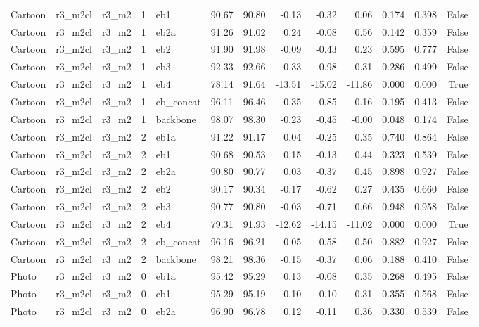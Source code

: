 \begin{table}
\begin{tabular}{lllrlrrrrrllr}
Cartoon & r3\_m2cl & r3\_m2 & 1 & eb1 & 90.67 & 90.80 & -0.13 & -0.32 & 0.06 & 0.174 & 0.398 & False \\
Cartoon & r3\_m2cl & r3\_m2 & 1 & eb2a & 91.26 & 91.02 & 0.24 & -0.08 & 0.56 & 0.142 & 0.359 & False \\
Cartoon & r3\_m2cl & r3\_m2 & 1 & eb2 & 91.90 & 91.98 & -0.09 & -0.43 & 0.23 & 0.595 & 0.777 & False \\
Cartoon & r3\_m2cl & r3\_m2 & 1 & eb3 & 92.33 & 92.66 & -0.33 & -0.98 & 0.31 & 0.286 & 0.499 & False \\
Cartoon & r3\_m2cl & r3\_m2 & 1 & eb4 & 78.14 & 91.64 & -13.51 & -15.02 & -11.86 & 0.000 & 0.000 & True \\
Cartoon & r3\_m2cl & r3\_m2 & 1 & eb\_concat & 96.11 & 96.46 & -0.35 & -0.85 & 0.16 & 0.195 & 0.413 & False \\
Cartoon & r3\_m2cl & r3\_m2 & 1 & backbone & 98.07 & 98.30 & -0.23 & -0.45 & -0.00 & 0.048 & 0.174 & False \\
Cartoon & r3\_m2cl & r3\_m2 & 2 & eb1a & 91.22 & 91.17 & 0.04 & -0.25 & 0.35 & 0.740 & 0.864 & False \\
Cartoon & r3\_m2cl & r3\_m2 & 2 & eb1 & 90.68 & 90.53 & 0.15 & -0.13 & 0.44 & 0.323 & 0.539 & False \\
Cartoon & r3\_m2cl & r3\_m2 & 2 & eb2a & 90.80 & 90.77 & 0.03 & -0.37 & 0.45 & 0.898 & 0.927 & False \\
Cartoon & r3\_m2cl & r3\_m2 & 2 & eb2 & 90.17 & 90.34 & -0.17 & -0.62 & 0.27 & 0.435 & 0.660 & False \\
Cartoon & r3\_m2cl & r3\_m2 & 2 & eb3 & 90.77 & 90.80 & -0.03 & -0.71 & 0.66 & 0.948 & 0.958 & False \\
Cartoon & r3\_m2cl & r3\_m2 & 2 & eb4 & 79.31 & 91.93 & -12.62 & -14.15 & -11.02 & 0.000 & 0.000 & True \\
Cartoon & r3\_m2cl & r3\_m2 & 2 & eb\_concat & 96.16 & 96.21 & -0.05 & -0.58 & 0.50 & 0.882 & 0.927 & False \\
Cartoon & r3\_m2cl & r3\_m2 & 2 & backbone & 98.21 & 98.36 & -0.15 & -0.37 & 0.06 & 0.188 & 0.410 & False \\
Photo & r3\_m2cl & r3\_m2 & 0 & eb1a & 95.42 & 95.29 & 0.13 & -0.08 & 0.35 & 0.268 & 0.495 & False \\
Photo & r3\_m2cl & r3\_m2 & 0 & eb1 & 95.29 & 95.19 & 0.10 & -0.10 & 0.31 & 0.355 & 0.568 & False \\
Photo & r3\_m2cl & r3\_m2 & 0 & eb2a & 96.90 & 96.78 & 0.12 & -0.11 & 0.36 & 0.330 & 0.539 & False \\

\end{tabular}
\end{table}
